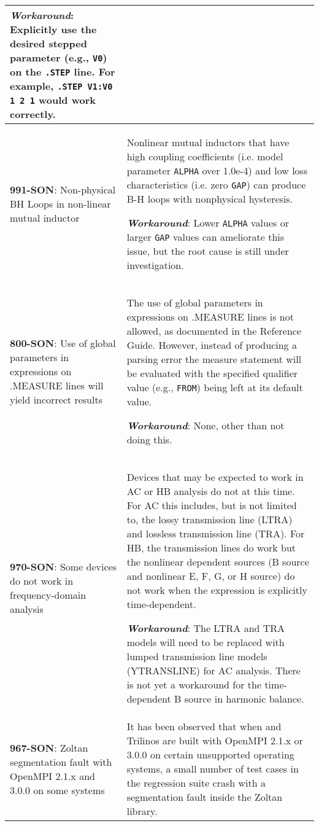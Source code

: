 {\begin{longtable}[h] {>{\raggedright\small}m{2in}|>{\raggedright\let\\\tabularnewline\small}m{3.5in}}
\textbf{\textit{Workaround}}: Explicitly use the desired stepped parameter
(e.g., \texttt{V0}) on the \texttt{.STEP} line.  For example, 
\texttt{.STEP V1:V0 1 2 1} would work correctly.
\\ \hline

\textbf{991-SON}: Non-physical BH Loops in non-linear mutual inductor &
Nonlinear mutual inductors that have high coupling coefficients (i.e. 
model parameter \texttt{ALPHA} over 1.0e-4) and low loss characteristics 
(i.e. zero \texttt{GAP}) can produce B-H loops with nonphysical hysteresis.

\textbf{\textit{Workaround}}: Lower \texttt{ALPHA} values or larger 
\texttt{GAP} values can ameliorate this issue, but the root cause is 
still under investigation. 
\\ \hline

\textbf{800-SON}: Use of global parameters in expressions on .MEASURE lines
will yield incorrect results & The use of global parameters in expressions
on .MEASURE lines is not allowed, as documented in the \Xyce{} Reference Guide.
However, instead of producing a parsing error the measure statement will be
evaluated with the specified qualifier value (e.g., \texttt{FROM}) being left
at its default value.

\textbf{\textit{Workaround}}: None, other than not doing this.
\\ \hline

\textbf{970-SON}: Some devices do not work in frequency-domain analysis &
Devices that may be expected to work in AC or HB analysis do not at
this time.  For AC this includes, but is not limited to, the lossy
transmission line (LTRA) and lossless transmission line (TRA).  For
HB, the transmission lines do work but the nonlinear dependent sources
(B source and nonlinear E, F, G, or H source) do not work when the
expression is explicitly time-dependent.

\textbf{\textit{Workaround}}: The LTRA and TRA models will need to be replaced
with lumped transmission line models (YTRANSLINE) for AC analysis.
There is not yet a workaround for the time-dependent B source in
harmonic balance.
\\ \hline

\textbf{967-SON}: Zoltan segmentation fault with OpenMPI 2.1.x and 3.0.0 on
some systems &

It has been observed that when \Xyce{} and Trilinos are built with
OpenMPI 2.1.x or 3.0.0 on certain unsupported operating systems, a
small number of test cases in the regression suite crash with a
segmentation fault inside the Zoltan library.


\end{longtable}}
